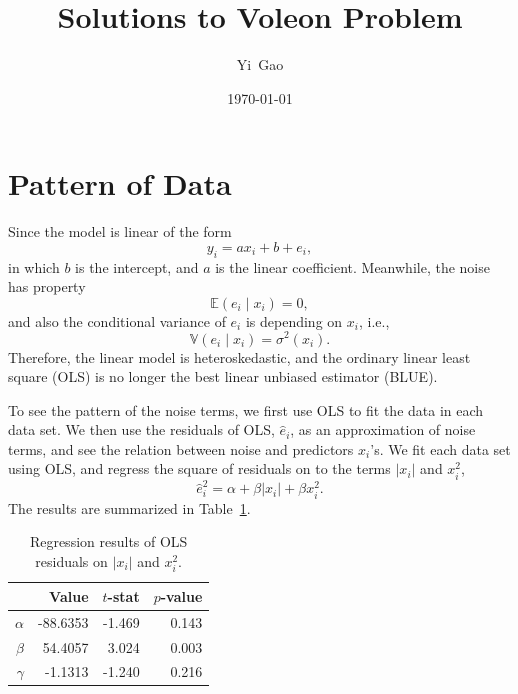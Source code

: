 \documentclass{revtex4}
\begin{document}
\title{Solutions to Voleon Problem}
\author{Yi~Gao}
\date{\today}

\maketitle

\section{Pattern of Data}

Since the model is linear of the form
\begin{equation}
  y_i = ax_i + b + e_i,
\end{equation}
in which $b$ is the intercept, and $a$ is the linear coefficient.
Meanwhile, the noise has property
\begin{equation}
  \mathbb{E}\left(e_i\mid x_i\right) = 0,
\end{equation}
and also the conditional variance of $e_i$ is depending on $x_i$, i.e.,
\begin{equation}
  \mathbb{V}\left(e_i\mid x_i\right) = \sigma^2\left(x_i\right).
\end{equation}
Therefore, the linear model is heteroskedastic, and the ordinary linear least square (OLS)
is no longer the best linear unbiased estimator (BLUE).

To see the pattern of the noise terms, we first use OLS to fit the data in each data set.
We then use the residuals of OLS, $\widehat{e}_i$, as an approximation of noise terms,
and see the relation between noise and predictors $x_i$'s.  We fit each data set using OLS,
and regress the square of residuals on to the terms $\left|x_i\right|$ and $x^2_i$,
\begin{equation}
  \widehat{e}^2_i = \alpha + \beta\left|x_i\right| + \beta x^2_i.
\end{equation}
The results are summarized in Table~\ref{tab:pattern}.
\begin{table}[!ht]
  \centering
  \begin{tabular}{rrrr}
    \hline\hline
    & Value & $t$-stat & $p$-value\\\hline
    $\alpha$ & -88.6353 & -1.469 & 0.143\\
    $\beta$  & 54.4057 & 3.024 & 0.003\\
    $\gamma$ & -1.1313 & -1.240 & 0.216\\
    \hline\hline
  \end{tabular}
  \caption{Regression results of OLS residuals on $\left|x_i\right|$ and $x^2_i$.}
  \label{tab:pattern}
\end{table}
\end{document}
